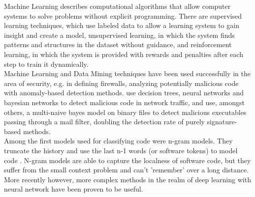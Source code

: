 \documentclass[
	a4paper,
	pagesize,
	pdftex,
	12pt,
	twoside, %
	BCOR=5mm, %
	ngerman,
	fleqn,
	final,
	]{scrartcl}
\begin{document}
Machine Learning describes computational algorithms that allow computer systems to solve problems without explicit programming. There are supervised learning techniques, which use labeled data to allow a learning system to gain insight and create a model, unsupervised learning, in which the system finds patterns and structures in the dataset without guidance, and reinforcement learning, in which the system is provided with rewards and penalties after each step to train it dynamically.\\

Machine Learning and Data Mining techniques have been used successfully in the area of security, e.g. in defining firewalls, analyzing potentially malicious code with anomaly-based detection methods. \cite{Elovici.2007} use decision trees, neural networks and bayesian networks to detect malicious code in network traffic, and \cite{Schultz.2000} use, amongst others, a multi-naive bayes model on binary files to detect malicious executables passing through a mail filter, doubling the detection rate of purely signature-based methods.\\

Among the first models used for classifying code were n-gram models. They truncate the history and use the last n-1 words (or software tokens) to model code \cite{Nguyen.2013,Pang.2015}. N-gram models are able to capture the localness of software code, but they suffer from the small context problem and can't 'remember' over a long distance. More recently however, more complex methods in the realm of deep learning with neural network have been proven to be useful.\\
\end{document}
